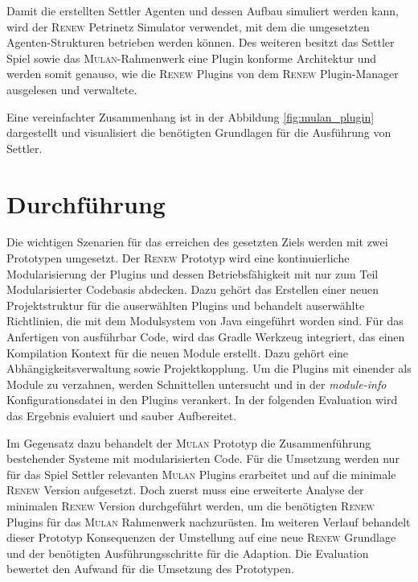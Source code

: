 	Damit die erstellten Settler Agenten und dessen Aufbau simuliert werden kann, wird der \textsc{Renew} Petrinetz Simulator verwendet, mit dem die umgesetzten Agenten-Strukturen betrieben werden können.\newline
	Des weiteren besitzt das Settler Spiel sowie das \textsc{Mulan}-Rahmenwerk eine Plugin konforme Architektur und werden somit genauso, wie die \textsc{Renew} Plugins von dem \textsc{Renew} Plugin-Manager ausgelesen und verwaltete.\bigbreak

	Eine vereinfachter Zusammenhang ist in der Abbildung \ref{fig:mulan_plugin} dargestellt und visualisiert die benötigten Grundlagen für die Ausführung von Settler.


\section{Durchführung} \label{sec:durchführung}
	Die wichtigen Szenarien für das erreichen des gesetzten Ziels werden mit zwei Prototypen umgesetzt. Der \textsc{Renew} Prototyp wird eine kontinuierliche  Modularisierung der Plugins und dessen Betriebsfähigkeit mit nur zum Teil Modularisierter Codebasis abdecken. Dazu gehört das Erstellen einer neuen Projektstruktur für die auserwählten Plugins und behandelt auserwählte Richtlinien, die mit dem Modulsystem von Java eingeführt worden sind. Für das Anfertigen von ausführbar Code, wird das Gradle Werkzeug integriert, das einen Kompilation Kontext für die neuen Module erstellt. Dazu gehört eine Abhängigkeitsverwaltung sowie Projektkopplung. Um die Plugins mit einender als Module zu verzahnen, werden Schnittellen untersucht und in der \textit{module-info} Konfigurationsdatei in den Plugins verankert. In der folgenden Evaluation wird das Ergebnis evaluiert und sauber Aufbereitet.\bigbreak 

	Im Gegensatz dazu behandelt der \textsc{Mulan} Prototyp die Zusammenführung bestehender Systeme mit modularisierten Code. Für die Umsetzung werden nur für das Spiel Settler relevanten \textsc{Mulan} Plugins erarbeitet und auf die minimale \textsc{Renew} Version aufgesetzt. Doch zuerst muss eine erweiterte Analyse der minimalen \textsc{Renew} Version durchgeführt werden, um die benötigten \textsc{Renew} Plugins für das \textsc{Mulan} Rahmenwerk nachzurüsten. Im weiteren Verlauf behandelt dieser Prototyp Konsequenzen der Umstellung auf eine neue \textsc{Renew} Grundlage und der benötigten Ausführungsschritte für die Adaption. Die Evaluation bewertet den Aufwand für die Umsetzung des Prototypen. 




